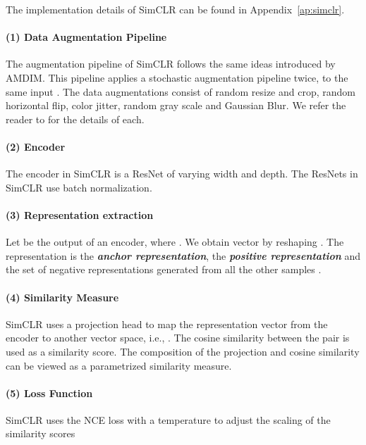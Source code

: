 \documentclass{article}
\begin{document}
The implementation details of SimCLR can be found in Appendix~\ref{ap:simclr}.

\paragraph{(1) Data Augmentation Pipeline}

The augmentation pipeline of SimCLR follows the same ideas introduced by AMDIM. This pipeline applies a stochastic augmentation pipeline twice, to the same input . The data augmentations consist of random resize and crop, random horizontal flip, color jitter, random gray scale and Gaussian Blur. We refer the reader to \cite{chen2020simple} for the details of each.

\paragraph{(2) Encoder}  

The encoder  in SimCLR is a ResNet of varying width and depth. The ResNets in SimCLR use batch normalization.

\paragraph{(3) Representation extraction}

Let  be the output of an encoder, where . We obtain vector by reshaping . The representation  is the \textit{\textbf{anchor representation}},  the \textit{\textbf{positive representation}} and  the set of negative representations generated from all the other samples .

\paragraph{(4) Similarity Measure}

SimCLR uses a projection head  to map the representation vector from the encoder to another vector space, i.e., . The cosine similarity between the  pair is used as a similarity score. The composition of the projection and cosine similarity can be viewed as a parametrized similarity measure.

\paragraph{(5) Loss Function}

SimCLR uses the NCE loss with a temperature  to adjust the scaling of the similarity scores
\end{document}
